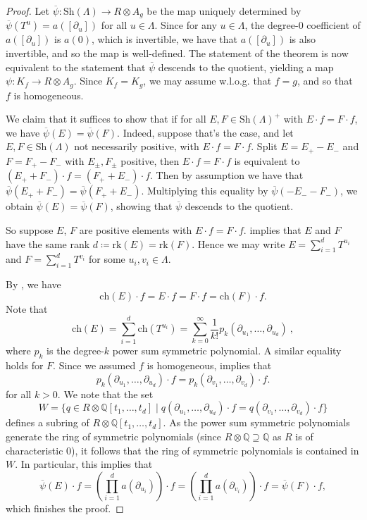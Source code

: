 \documentclass[oneside]{amsart}
\theoremstyle{plain}
\theoremstyle{definition}
\newcommand{\Q}{{\mathbb{Q}}}
\newcommand{\rk}{{\mathrm{rk}}}
\newcommand{\Sh}{{\mathrm{Sh}}}
\newcommand{\ch}{{\mathrm{ch}}}
\newcommand{\psibar}{\overline{\psi}}
\begin{document}
\begin{proof}

Let $\psibar: \Sh(\Lambda) \to R \otimes A_g$ be the map uniquely determined by 
$\psibar(T^u) = a([\partial_u])$ for all $u \in \Lambda$. Since for any $u \in \Lambda$, the degree-$0$ coefficient of $a([\partial_u])$ is $a(0)$, which is invertible, we have that $a([\partial_u])$ is also invertible, and so the map is well-defined. The statement of the theorem is now equivalent to the statement that $\psibar$ descends to the quotient, yielding a map $\psi: K_f \to R \otimes A_g$. Since $K_f = K_g$, we may assume w.l.o.g. that $f=g$, and so that $f$ is homogeneous.

We claim that it suffices to show that if for all $E, F \in \Sh(\Lambda)^+$ with $E\cdot f = F\cdot f$, we have $\psibar(E) = \psibar(F)$.
Indeed, suppose that's the case, and let $E, F \in \Sh(\Lambda)$ not necessarily positive, with
$E \cdot f = F \cdot f$.
Split $E = E_+ - E_-$ and $F = F_+ - F_-$ with $E_\pm, F_\pm$ positive, then $E \cdot f = F \cdot f$ is equivalent to $(E_+ + F_-) \cdot f = (F_+ + E_-)\cdot f$. 
Then by assumption we have that $\psibar(E_+ + F_-) = \psibar(F_+ + E_-)$.
Multiplying this equality by $\psibar(-E_- -F_-)$, we obtain $\psibar(E) = \psibar(F)$, showing that $\psibar$ descends to the quotient.

So suppose $E$, $F$ are positive elements with $E \cdot f = F \cdot f$.
 implies that $E$ and $F$ have the same rank $d\coloneqq\rk(E)=\rk(F)$.
Hence we may write $E=\sum_{i=1}^d T^{u_i}$ and $F=\sum_{i=1}^d T^{v_i}$ for some $u_i,v_i\in \Lambda$.

By , we have 
\begin{equation}
\label{eq:apply chern character to prove lambda-ideal}
\ch(E)\cdot f=E \cdot f=F \cdot f=\ch(F) \cdot f.  
\end{equation}
Note that 
\begin{equation*}
    \ch(E)= \sum_{i=1}^d \ch(T^{u_i})=\sum_{k=0}^\infty \frac 1{k!} p_k(\partial_{u_1}, \dots, \partial_{u_d}) \ ,
\end{equation*}
where $p_k$ is the degree-$k$ power sum symmetric polynomial. A similar equality holds for $F$.
Since we assumed $f$ is homogeneous,  implies that 
\[
p_k(\partial_{u_1}, \dots, \partial_{u_d}) \cdot f=
p_k(\partial_{v_1}, \dots, \partial_{v_d}) \cdot f.
\]
for all $k>0$. We note that the set 
\[
W=\{q\in R\otimes \Q[t_1,\ldots,t_d]\mid
q(\partial_{u_1}, \dots, \partial_{u_d}) \cdot f=
q(\partial_{v_1}, \dots, \partial_{v_d}) \cdot f\}
\]
defines a subring of $R\otimes \Q[t_1, \dots, t_d]$.
As the power sum symmetric polynomials generate the ring of symmetric polynomials (since $R \otimes \Q \supseteq \Q$ as $R$ is of characteristic $0$), it follows that the ring of symmetric polynomials is contained in $W$.
In particular, this implies that
\[
    \psibar(E) \cdot f = \left( \prod_{i = 1} ^ d a(\partial_{u_i}) \right) \cdot f
    = \left( \prod_{i = 1} ^ d a(\partial_{v_i}) \right) \cdot f = \psibar(F) \cdot f,
\]
which finishes the proof.
\end{proof}
\end{document}
